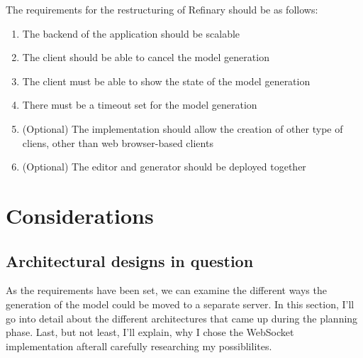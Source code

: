 The requirements for the restructuring of Refinary should be as follows:
\begin{enumerate}
        \item The backend of the application should be scalable 
        \item The client should be able to cancel the model generation
        \item The client must be able to show the state of the model generation  
        \item There must be a timeout set for the model generation
		\item (Optional) The implementation should allow the creation of other type of cliens,
		other than web browser-based clients
		\item (Optional) The editor and generator should be deployed together
\end{enumerate}


\chapter{Considerations}

\section{Architectural designs in question}
As the requirements have been set, we can examine the different ways the generation of the model could be
moved to a separate server. In this section, I'll go into detail about the different architectures that came up during
the planning phase. Last, but not least, I'll explain, why I chose the WebSocket implementation afterall carefully researching
my possiblilites.

